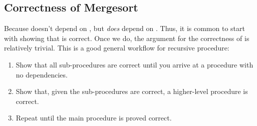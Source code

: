 \documentclass[titlepage, 12pt, leqno]{article}
\begin{document}
\pagebreak

\subsection{Correctness of Mergesort}
Because  doesn't depend on , but 
 \textit{does} depend on . Thus, it is 
common to start with showing that  is correct. Once we do, the
argument for the correctness of  is relatively trivial. This is
a good general workflow for recursive procedure:
\begin{enumerate}
    \item Show that all sub-procedures are correct until you arrive at a
        procedure with no dependencies.
    \item Show that, given the sub-procedures are correct, a higher-level
        procedure is correct.
    \item Repeat until the main procedure is proved correct.
\end{enumerate}
\end{document}
